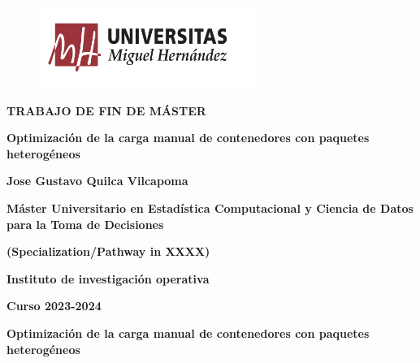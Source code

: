 \documentclass[openany]{article}
\begin{document}

\thispagestyle{empty}    

\begin{titlepage}
\begin{figure}[th]
\begin{flushleft}
    \includegraphics[width=7cm]{Figures/image1.png}
\end{flushleft}
\end{figure}
 \vspace{1cm}

{\flushleft \LARGE \bfseries TRABAJO DE FIN DE MÁSTER\par}\vspace{2cm}

{\flushright \LARGE \bfseries Optimización de la carga manual de contenedores con paquetes heterogéneos  \par}\vspace{2cm}

{\flushleft \LARGE \bfseries Jose Gustavo Quilca Vilcapoma \par}\vspace{1.5cm}

{\flushleft \bfseries Máster Universitario en Estadística Computacional y Ciencia de Datos para la Toma de Decisiones\par}\vspace{0.cm}
{\flushleft \bfseries (Specialization/Pathway in XXXX)\par}\vspace{0.cm}
{\flushleft \bfseries Instituto de investigación operativa\par}\vspace{1cm}

{\flushleft \small \bfseries Curso 2023-2024\par}\vspace{2cm}

\newpage\thispagestyle{empty}

{\flushleft \LARGE \bfseries Optimización de la carga manual de contenedores con paquetes heterogéneos \par} \vspace{1.5cm}


\end{titlepage}
\end{document}
